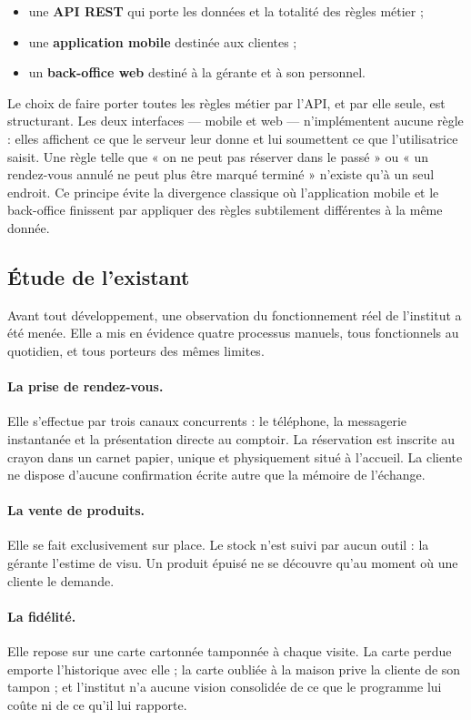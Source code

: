 \begin{itemize}[leftmargin=1.2cm]
  \item une \textbf{API REST} qui porte les données et la totalité des règles
  métier ;
  \item une \textbf{application mobile} destinée aux clientes ;
  \item un \textbf{back-office web} destiné à la gérante et à son personnel.
\end{itemize}

Le choix de faire porter toutes les règles métier par l'API, et par elle seule,
est structurant. Les deux interfaces --- mobile et web --- n'implémentent
aucune règle : elles affichent ce que le serveur leur donne et lui soumettent
ce que l'utilisatrice saisit. Une règle telle que « on ne peut pas réserver
dans le passé » ou « un rendez-vous annulé ne peut plus être marqué terminé »
n'existe qu'à un seul endroit. Ce principe évite la divergence classique où
l'application mobile et le back-office finissent par appliquer des règles
subtilement différentes à la même donnée.

\subsection{Étude de l'existant}

Avant tout développement, une observation du fonctionnement réel de l'institut
a été menée. Elle a mis en évidence quatre processus manuels, tous fonctionnels
au quotidien, et tous porteurs des mêmes limites.

\paragraph{La prise de rendez-vous.} Elle s'effectue par trois canaux
concurrents : le téléphone, la messagerie instantanée et la présentation
directe au comptoir. La réservation est inscrite au crayon dans un carnet
papier, unique et physiquement situé à l'accueil. La cliente ne dispose
d'aucune confirmation écrite autre que la mémoire de l'échange.

\paragraph{La vente de produits.} Elle se fait exclusivement sur place. Le
stock n'est suivi par aucun outil : la gérante l'estime de visu. Un produit
épuisé ne se découvre qu'au moment où une cliente le demande.

\paragraph{La fidélité.} Elle repose sur une carte cartonnée tamponnée à chaque
visite. La carte perdue emporte l'historique avec elle ; la carte oubliée à la
maison prive la cliente de son tampon ; et l'institut n'a aucune vision
consolidée de ce que le programme lui coûte ni de ce qu'il lui rapporte.

